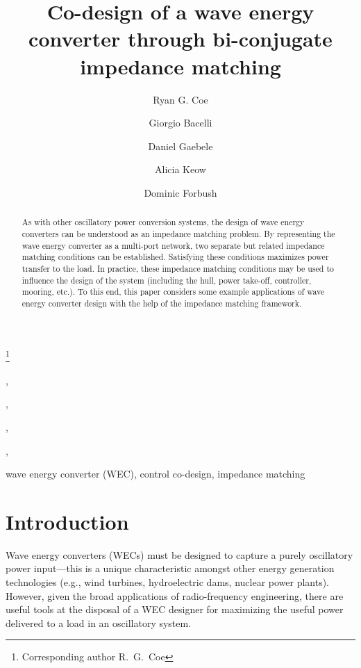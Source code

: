 \documentclass[twocolumn]{autart}
\begin{document}
\begin{frontmatter}

\title{Co-design of a wave energy converter through bi-conjugate impedance matching}

\thanks[footnoteinfo]{Corresponding author R.~G.~Coe}

\author[Sandia]{Ryan G. Coe},
\author[Sandia]{Giorgio Bacelli},
\author[Sandia]{Daniel Gaebele},
\author[Sandia]{Alicia Keow},
\author[Sandia]{Dominic Forbush}

\address[Sandia]{Sandia National Laboratories, Albuquerque, NM, USA}

\begin{keyword}
wave energy converter (WEC), control co-design, impedance matching
\end{keyword}

\begin{abstract}
As with other oscillatory power conversion systems, the design of wave energy converters can be understood as an impedance matching problem. 
By representing the wave energy converter as a multi-port network, two separate but related impedance matching conditions can be established. 
Satisfying these conditions maximizes power transfer to the load. 
In practice, these impedance matching conditions may be used to influence the design of the system (including the hull, power take-off, controller, mooring, etc.). 
To this end, this paper considers some example applications of wave energy converter design with the help of the impedance matching framework.
\end{abstract}

\end{frontmatter}

\section{Introduction}\label{sec:introduction}
Wave energy converters (WECs) must be designed to capture a purely oscillatory power input—this is a unique characteristic amongst other energy generation technologies (e.g., wind turbines, hydroelectric dams, nuclear power plants).
However, given the broad applications of radio-frequency engineering, there are useful tools at the disposal of a WEC designer for maximizing the useful power delivered to a load in an oscillatory system.
\end{document}
